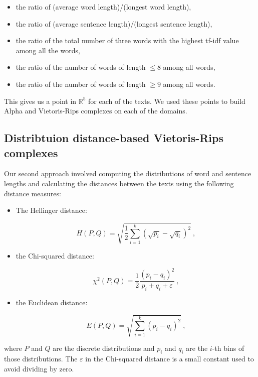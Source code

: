 \documentclass[12pt,a4paper]{amsart}
\def\R{\mathbb R}
\begin{document}
\begin{itemize}
  \item the ratio of (average word length)/(longest word length),
  \item the ratio of (average sentence length)/(longest sentence length),
  \item the ratio of the total number of three words with the highest tf-idf
    value among all the words,
  \item the ratio of the number of words of length $\le 8$ among all words,
  \item the ratio of the number of words of length $\ge 9$ among all words.
\end{itemize}

This gives us a point in $\R^5$ for each of the texts. We used these points to
build Alpha and Vietoris-Rips complexes on each of the domains.

\subsection{Distribtuion distance-based Vietoris-Rips complexes}

Our second approach involved computing the distributions of word and sentence
lengths and calculating the distances between the texts using the following
distance measures:

\begin{itemize}
\item The Hellinger distance:

\begin{equation*}
  H(P,Q) = \sqrt{\frac{1}{2} \sum_{i=1}^k\left(\sqrt{p_i} -
    \sqrt{q_i}\right)^2}\ ,
\end{equation*}

\item the Chi-squared distance:

\begin{equation*}
  \chi^2(P,Q) = \frac{1}{2} \frac{(p_i - q_i)^2}{p_i + q_i + \varepsilon}\ ,
\end{equation*}

\item the Euclidean distance:

\begin{equation*}
  E(P,Q) = \sqrt{\sum_{i=1}^k\left(p_i - q_i\right)^2}\ ,
\end{equation*}
\end{itemize}

\noindent
where $P$ and $Q$ are the discrete distributions and $p_i$ and $q_i$ are the
$i$-th bins of those distributions. The $\varepsilon$ in the Chi-squared
distance is a small constant used to avoid dividing by zero.
\end{document}
